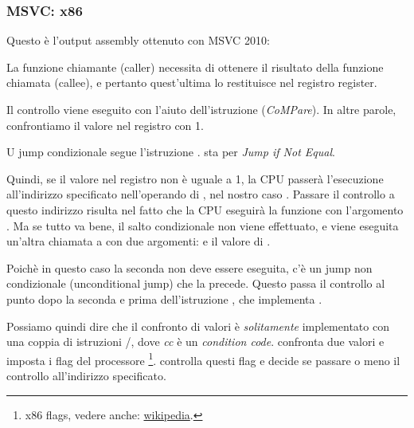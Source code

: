 \subsubsection{MSVC: x86}

Questo è l'output assembly ottenuto con MSVC 2010:



La funzione chiamante (\gls{caller}) \main necessita di ottenere il risultato della funzione chiamata (\gls{callee}), 
e pertanto quest'ultima lo restituisce nel registro \EAX register.

Il controllo viene eseguito con l'aiuto dell'istruzione  (\emph{CoMPare}). In altre parole, confrontiamo il valore nel registro \EAX con 1.

U jump condizionale \JNE segue l'istruzione \CMP. \JNE sta per \emph{Jump if Not Equal}.

Quindi, se il valore nel registro \EAX non è uguale a 1, la \ac{CPU} passerà l'esecuzione all'indirizzo specificato nell'operando di \JNE, nel nostro caso .
Passare il controllo a questo indirizzo risulta nel fatto che la \ac{CPU} eseguirà la funzione \printf con l'argomento .
Ma se tutto va bene, il salto condizionale non viene effettuato, e viene eseguita un'altra chiamata a \printf con due argomenti:  e il valore di .

Poichè in questo caso la seconda \printf non deve essere eseguita, c'è un jump non condizionale (unconditional jump) \JMP che la precede. 
Questo passa il controllo al punto dopo la seconda \printf e prima dell'istruzione , che implementa .

Possiamo quindi dire che il confronto di valori è \emph{solitamente} implementato con una coppia di istruzioni \CMP/\Jcc, dove \emph{cc} è un \emph{condition code}.
\CMP confronta due valori e imposta i flag del processore \footnote{x86 flags, vedere anche: \href{http://en.wikipedia.org/wiki/FLAGS_register_(computing)}{wikipedia}.}.
\Jcc controlla questi flag e decide se passare o meno il controllo all'indirizzo specificato.

